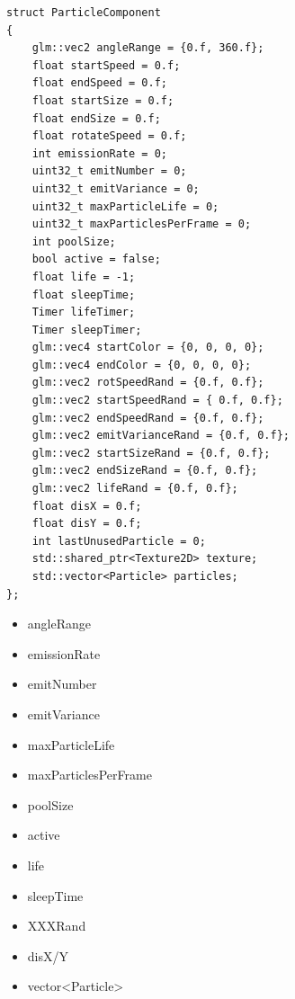 \begin{lstlisting}
struct ParticleComponent
{
    glm::vec2 angleRange = {0.f, 360.f};
    float startSpeed = 0.f;
    float endSpeed = 0.f;
    float startSize = 0.f;
    float endSize = 0.f;
    float rotateSpeed = 0.f;
    int emissionRate = 0;
    uint32_t emitNumber = 0;
    uint32_t emitVariance = 0;
    uint32_t maxParticleLife = 0;
    uint32_t maxParticlesPerFrame = 0;
    int poolSize;
    bool active = false;
    float life = -1;
    float sleepTime;
    Timer lifeTimer;
    Timer sleepTimer;
    glm::vec4 startColor = {0, 0, 0, 0};
    glm::vec4 endColor = {0, 0, 0, 0};
    glm::vec2 rotSpeedRand = {0.f, 0.f};
    glm::vec2 startSpeedRand = { 0.f, 0.f};
    glm::vec2 endSpeedRand = {0.f, 0.f};
    glm::vec2 emitVarianceRand = {0.f, 0.f};
    glm::vec2 startSizeRand = {0.f, 0.f};
    glm::vec2 endSizeRand = {0.f, 0.f};
    glm::vec2 lifeRand = {0.f, 0.f};
    float disX = 0.f;
    float disY = 0.f;
    int lastUnusedParticle = 0;
    std::shared_ptr<Texture2D> texture;
    std::vector<Particle> particles;
};
\end{lstlisting}

\begin{itemize}
\item{angleRange}
\item{emissionRate}
\item{emitNumber}
\item{emitVariance}
\item{maxParticleLife}
\item{maxParticlesPerFrame}
\item{poolSize}
\item{active}
\item{life}
\item{sleepTime}
\item{XXXRand}
\item{disX/Y}
\item{vector<Particle>}
\end{itemize}

